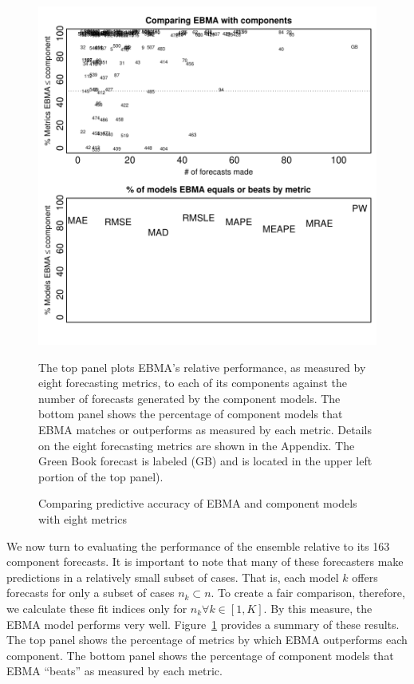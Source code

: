 \documentclass[12pt,fullpage,endnotes]{article}
\begin{document}
\begin{figure}[!htb]
\caption{Comparing predictive accuracy of EBMA and component models with eight metrics}
\label{compare2Components}
\begin{center}
\includegraphics{compare2Components}
\end{center}

\footnotesize
The top panel plots EBMA's relative performance, as measured by eight
forecasting metrics, to each of its components against the number of
forecasts generated by the component models.  The bottom panel shows
the percentage of component models that EBMA matches or outperforms as
measured by each metric.  Details on the eight forecasting metrics are
shown in the Appendix.  The Green Book forecast is labeled (GB) and is
located in the upper left portion of the top panel).


\end{figure}

We now turn to evaluating the performance of the ensemble relative to
its 163 component forecasts.  It is important to note that many of
these forecasters make predictions in a relatively small subset of
cases.  That is, each model $k$ offers forecasts for only a subset of
cases $n_k \subset n$.  To create a fair comparison, therefore, we
calculate these fit indices only for $n_k \forall k \in [1,K]$.  By
this measure, the EBMA model performs very well.
Figure~\ref{compare2Components} provides a summary of these results.
The top panel shows the percentage of metrics by which EBMA
outperforms each component. The bottom panel shows the percentage of
component models that EBMA ``beats'' as measured by each metric.
\end{document}
